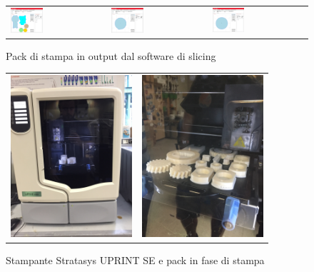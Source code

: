 \documentclass[%
corpo=11pt,
twoside,
 stile=classica,
oldstyle,
greek,%
]{toptesi}
\begin{document}
		\begin{figure}
		\centering
		\begin{tabular}{lll}
		\includegraphics[width=0.35\textwidth]{Screen/pack1.png}
		&
		\includegraphics[width=0.35\textwidth]{Screen/pack2.png}
		&
		\includegraphics[width=0.35\textwidth]{Screen/pack3.png}
		\end{tabular}
		\caption{Pack di stampa in output dal software di slicing }
		\label{fig:pack}
		\end{figure} 
	\begin{figure}
		\centering
		\begin{tabular}{ll}
		\includegraphics[height=6cm,keepaspectratio]{image/uprint.jpg}
		&
		\includegraphics[height=6cm,keepaspectratio]{image/uprintp.jpg}
		\end{tabular}	
	\caption{Stampante Stratasys UPRINT SE e pack in fase di stampa}
	\label{fig:uprint}
	\end{figure}	
\end{document}
